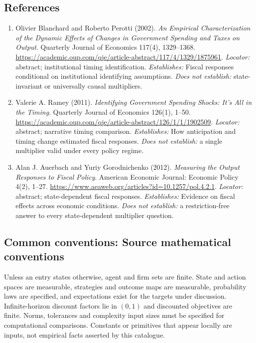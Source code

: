\documentclass[11pt,a4paper]{article}
\begin{document}
\subsection*{References}

\begin{enumerate}

\item[S1] Olivier Blanchard and Roberto Perotti (2002). \emph{An Empirical Characterization of the Dynamic Effects of Changes in Government Spending and Taxes on Output}. Quarterly Journal of Economics 117(4), 1329--1368. \url{https://academic.oup.com/qje/article-abstract/117/4/1329/1875961}. \textit{Locator:} abstract; institutional timing identification. \textit{Establishes:} Fiscal responses conditional on institutional identifying assumptions. \textit{Does not establish:} state-invariant or universally causal multipliers.

\item[S2] Valerie A. Ramey (2011). \emph{Identifying Government Spending Shocks: It's All in the Timing}. Quarterly Journal of Economics 126(1), 1--50. \url{https://academic.oup.com/qje/article-abstract/126/1/1/1902509}. \textit{Locator:} abstract; narrative timing comparison. \textit{Establishes:} How anticipation and timing change estimated fiscal responses. \textit{Does not establish:} a single multiplier valid under every policy regime.

\item[S3] Alan J. Auerbach and Yuriy Gorodnichenko (2012). \emph{Measuring the Output Responses to Fiscal Policy}. American Economic Journal: Economic Policy 4(2), 1--27. \url{https://www.aeaweb.org/articles?id=10.1257/pol.4.2.1}. \textit{Locator:} abstract; state-dependent fiscal responses. \textit{Establishes:} Evidence on fiscal effects across economic conditions. \textit{Does not establish:} a restriction-free answer to every state-dependent multiplier question.

\end{enumerate}

\subsection*{Common conventions: Source mathematical conventions}

Unless an entry states otherwise, agent and firm sets are finite. State and action spaces are measurable, strategies and outcome maps are measurable, probability laws are specified, and expectations exist for the targets under discussion. Infinite-horizon discount factors lie in $(0,1)$ and discounted objectives are finite. Norms, tolerances and complexity input sizes must be specified for computational comparisons. Constants or primitives that appear locally are inputs, not empirical facts asserted by this catalogue.
\end{document}
